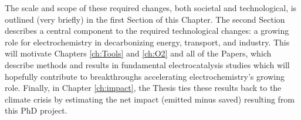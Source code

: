 The scale and scope of these required changes, both societal and technological, is outlined (very briefly) in the first Section of this Chapter. The second Section describes a central component to the required technological changes: a growing role for electrochemistry in decarbonizing energy, transport, and industry. This will motivate Chapters \ref{ch:Tools} and \ref{ch:O2} and all of the Papers, which describe methods and results in fundamental electrocatalysis studies which will hopefully contribute to breakthroughs accelerating electrochemistry's growing role. Finally, in Chapter \ref{ch:impact}, the Thesis ties these results back to the climate crisis by estimating the net  impact (emitted minus saved) resulting from this PhD project.
